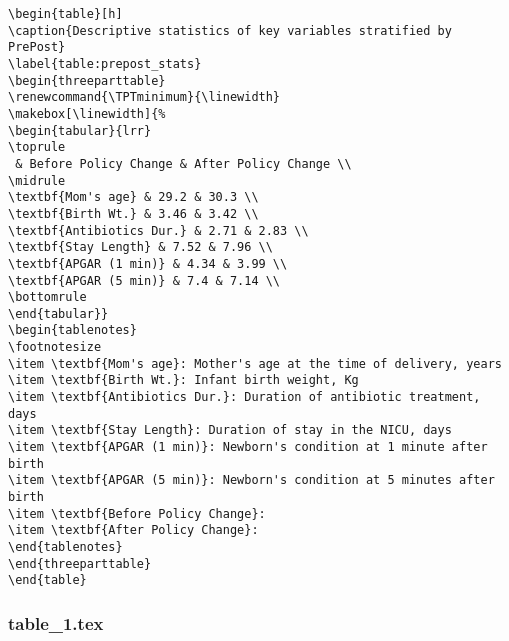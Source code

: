 \documentclass[11pt]{article}
\begin{document}
\begin{Verbatim}[tabsize=4]
\begin{table}[h]
\caption{Descriptive statistics of key variables stratified by PrePost}
\label{table:prepost_stats}
\begin{threeparttable}
\renewcommand{\TPTminimum}{\linewidth}
\makebox[\linewidth]{%
\begin{tabular}{lrr}
\toprule
 & Before Policy Change & After Policy Change \\
\midrule
\textbf{Mom's age} & 29.2 & 30.3 \\
\textbf{Birth Wt.} & 3.46 & 3.42 \\
\textbf{Antibiotics Dur.} & 2.71 & 2.83 \\
\textbf{Stay Length} & 7.52 & 7.96 \\
\textbf{APGAR (1 min)} & 4.34 & 3.99 \\
\textbf{APGAR (5 min)} & 7.4 & 7.14 \\
\bottomrule
\end{tabular}}
\begin{tablenotes}
\footnotesize
\item \textbf{Mom's age}: Mother's age at the time of delivery, years
\item \textbf{Birth Wt.}: Infant birth weight, Kg
\item \textbf{Antibiotics Dur.}: Duration of antibiotic treatment, days
\item \textbf{Stay Length}: Duration of stay in the NICU, days
\item \textbf{APGAR (1 min)}: Newborn's condition at 1 minute after birth
\item \textbf{APGAR (5 min)}: Newborn's condition at 5 minutes after birth
\item \textbf{Before Policy Change}:
\item \textbf{After Policy Change}:
\end{tablenotes}
\end{threeparttable}
\end{table}

\end{Verbatim}

\subsubsection*{table\_1.tex}
\end{document}
